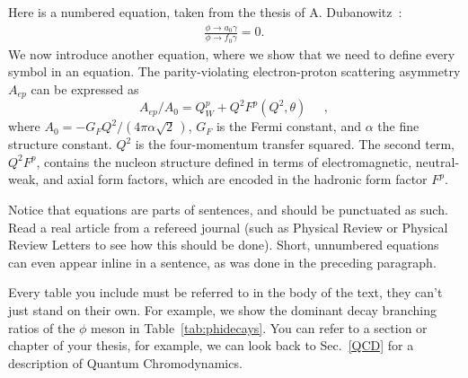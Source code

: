 \documentclass[12pt]{report}
\begin{document}
Here is a numbered equation, taken from the thesis of A. Dubanowitz~\cite{UPV}:
%
\begin{eqnarray}
\frac{\phi\rightarrow a_0\gamma}{\phi\rightarrow f_0\gamma} = 0 .
\end{eqnarray}\label{eq:a0_decay_equation} %
%
We now introduce another equation, where we show that we need to define
every symbol in an equation. The parity-violating electron-proton
scattering asymmetry $A_{ep}$ can be expressed as
%
\begin{equation}
A_{ep} / A_0 = Q_{W}^{p}+Q^{2}F^{p}(Q^{2},\theta) \;\;\;\;\;  ,
\label{eq:asymmetry}
\end{equation}
%
where
$A_0 = -G_{F}Q^{2} / \left( {4\pi\alpha\sqrt{2}} \, \right)$,
$G_F$ is the Fermi constant, and $\alpha$ the fine structure constant.
$Q^2$ is the four-momentum transfer squared.
The second term, $Q^2 F^p$, contains the nucleon structure defined in terms of electromagnetic, neutral-weak, and axial form factors, which are encoded in the
hadronic form factor $F^p$.

Notice that equations are parts of sentences,
and should be punctuated as such. Read a real article from a refereed journal
(such as Physical Review or Physical Review Letters to see how this should
be done). Short, unnumbered equations can even appear
inline in a sentence, as was done in the preceding paragraph.

Every table you include must be referred to in the body of the text,
they can't just stand on their own. For example, we show the
dominant decay branching ratios of the $\phi$ meson in Table~\ref{tab:phidecays}.
You can refer to a section or chapter of your thesis, for example, we can look
back to Sec.~\ref{QCD} for a description of Quantum Chromodynamics.
\end{document}
